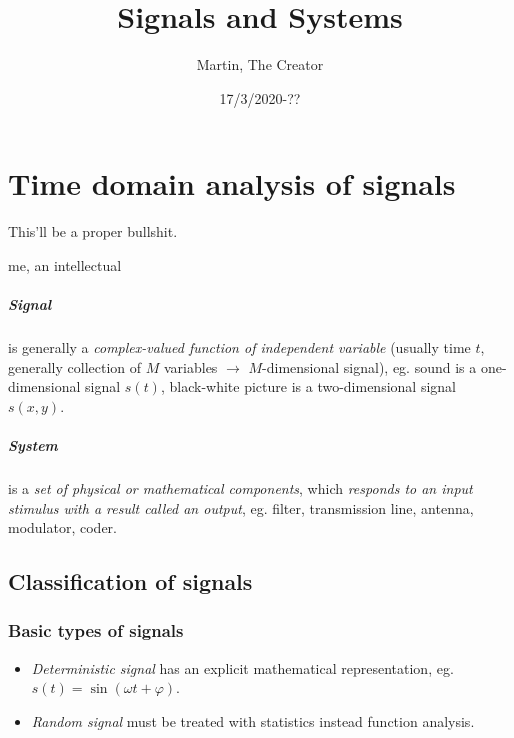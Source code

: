 \documentclass[11pt,a4paper]{report}
\title{Signals and Systems}
\author{Martin, The Creator}
\date{17/3/2020-??}
\theoremstyle{remark}
\theoremstyle{definition}
\begin{document}
	
	
	\maketitle
	\newpage
	
	\tableofcontents
	\newpage
	
	
	
	\chapter{Time domain analysis of signals}
	\epigraph{
		This'll be a proper bullshit.
	}{me, an intellectual}
			
		\paragraph{Signal} is generally a \textit{complex-valued function of independent variable} (usually time $t$, generally collection of $M$ variables $\rightarrow$ $M$-dimensional signal), eg. sound is a one-dimensional signal $s(t)$, black-white picture is a two-dimensional signal $s(x,y)$.
		
		\paragraph{System} is a \textit{set of physical or mathematical components}, which \textit{responds to an input stimulus with a result called an output}, eg. filter, transmission line, antenna, modulator, coder.
			
		\section{Classification of signals}
			
			\subsection{Basic types of signals}
				
				\begin{itemize}
					\item \textit{Deterministic signal} has an explicit mathematical representation, eg. $s(t) = \sin(\omega t + \varphi)$.
					
					\item \textit{Random signal} must be treated with statistics instead function analysis.
				\end{itemize}
				
\end{document}
